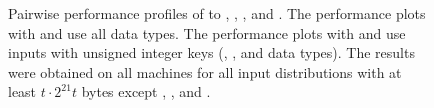 \begin{figure}[tbp]
  \caption{Pairwise performance profiles of \compiparassssort to
    \compppbbs, \comppbalancedsort, \radixregion, and
    \compiparassrsort. The performance plots with \compppbbs and
    \comppbalancedsort use all data types. The performance plots with
    \radixregion and \compiparassrsort use inputs with
    unsigned integer keys (\uint, \ulong, and \pair data types). The
    results were obtained on all machines for all input distributions
    with at least $t\cdot 2^{21}t$ bytes except \distsorted,
    \distreversesorted, and \distones.}\label{fig:perf par}
\end{figure}

